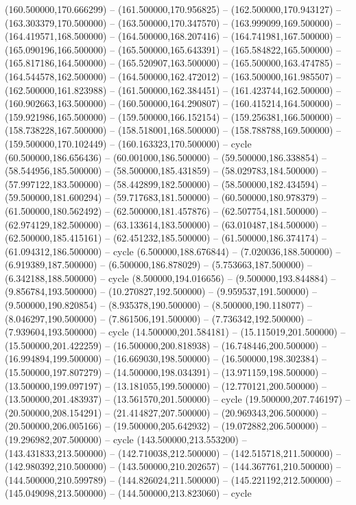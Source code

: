    (160.500000,170.666299) -- (161.500000,170.956825) -- (162.500000,170.943127) -- (163.303379,170.500000) -- (163.500000,170.347570) -- (163.999099,169.500000) -- (164.419571,168.500000) -- (164.500000,168.207416) -- (164.741981,167.500000) -- (165.090196,166.500000) -- (165.500000,165.643391) -- (165.584822,165.500000) -- (165.817186,164.500000) -- (165.520907,163.500000) -- (165.500000,163.474785) -- (164.544578,162.500000) -- (164.500000,162.472012) -- (163.500000,161.985507) -- (162.500000,161.823988) -- (161.500000,162.384451) -- (161.423744,162.500000) -- (160.902663,163.500000) -- (160.500000,164.290807) -- (160.415214,164.500000) -- (159.921986,165.500000) -- (159.500000,166.152154) -- (159.256381,166.500000) -- (158.738228,167.500000) -- (158.518001,168.500000) -- (158.788788,169.500000) -- (159.500000,170.102449) -- (160.163323,170.500000) -- cycle
   (60.500000,186.656436) -- (60.001000,186.500000) -- (59.500000,186.338854) -- (58.544956,185.500000) -- (58.500000,185.431859) -- (58.029783,184.500000) -- (57.997122,183.500000) -- (58.442899,182.500000) -- (58.500000,182.434594) -- (59.500000,181.600294) -- (59.717683,181.500000) -- (60.500000,180.978379) -- (61.500000,180.562492) -- (62.500000,181.457876) -- (62.507754,181.500000) -- (62.974129,182.500000) -- (63.133614,183.500000) -- (63.010487,184.500000) -- (62.500000,185.415161) -- (62.451232,185.500000) -- (61.500000,186.374174) -- (61.094312,186.500000) -- cycle
   (6.500000,188.676844) -- (7.020036,188.500000) -- (6.919389,187.500000) -- (6.500000,186.878029) -- (5.753663,187.500000) -- (6.342188,188.500000) -- cycle
   (8.500000,194.016656) -- (9.500000,193.844884) -- (9.856784,193.500000) -- (10.270827,192.500000) -- (9.959537,191.500000) -- (9.500000,190.820854) -- (8.935378,190.500000) -- (8.500000,190.118077) -- (8.046297,190.500000) -- (7.861506,191.500000) -- (7.736342,192.500000) -- (7.939604,193.500000) -- cycle
   (14.500000,201.584181) -- (15.115019,201.500000) -- (15.500000,201.422259) -- (16.500000,200.818938) -- (16.748446,200.500000) -- (16.994894,199.500000) -- (16.669030,198.500000) -- (16.500000,198.302384) -- (15.500000,197.807279) -- (14.500000,198.034391) -- (13.971159,198.500000) -- (13.500000,199.097197) -- (13.181055,199.500000) -- (12.770121,200.500000) -- (13.500000,201.483937) -- (13.561570,201.500000) -- cycle
   (19.500000,207.746197) -- (20.500000,208.154291) -- (21.414827,207.500000) -- (20.969343,206.500000) -- (20.500000,206.005166) -- (19.500000,205.642932) -- (19.072882,206.500000) -- (19.296982,207.500000) -- cycle
   (143.500000,213.553200) -- (143.431833,213.500000) -- (142.710038,212.500000) -- (142.515718,211.500000) -- (142.980392,210.500000) -- (143.500000,210.202657) -- (144.367761,210.500000) -- (144.500000,210.599789) -- (144.826024,211.500000) -- (145.221192,212.500000) -- (145.049098,213.500000) -- (144.500000,213.823060) -- cycle
